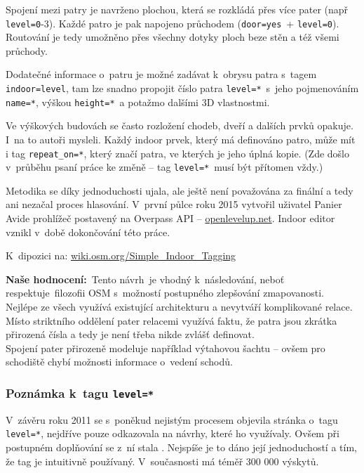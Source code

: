 Spojení mezi patry je navrženo plochou, která se rozkládá přes více pater (např \texttt{level=0}-3). Každé patro je pak napojeno průchodem (\texttt{door=yes}~+ \texttt{level=0}). Routování je tedy umožněno přes všechny dotyky ploch beze stěn a též všemi průchody.

Dodatečné informace o~patru je možné zadávat k~obrysu patra s~tagem \texttt{indoor=level}, tam lze snadno propojit číslo patra \texttt{level=*}~s~jeho pojmenováním \texttt{name=*}, výškou \texttt{height=*}~a potažmo dalšími 3D vlastnostmi.

Ve výškových budovách se často rozložení chodeb, dveří a dalších prvků opakuje. I~na to autoři mysleli. Každý indoor prvek, který má definováno patro, může mít i tag \texttt{repeat\_on=*}, který značí patra, ve kterých je jeho úplná kopie. (Zde došlo v~průběhu psaní práce ke změně -- tag \texttt{level=*}~musí být přítomen vždy.)

Metodika se díky jednoduchosti ujala, ale ještě není považována za finální a tedy ani nezačal proces hlasování. V~první půlce roku 2015 vytvořil uživatel Panier Avide prohlížeč postavený na Overpass API -- \href{http://openlevelup.net}{openlevelup.net}. Indoor editor vznikl v~době dokončování této práce.

K~dipozici na: \href{http://wiki.osm.org/Simple\_Indoor\_Tagging}{wiki.osm.org/Simple\_Indoor\_Tagging}

\textbf{Naše hodnocení:}~Tento návrh~je vhodný k~následování, neboť respektuje~filozofii OSM s~možností postupného zlepšování zmapovanosti. Nejlépe ze všech využívá existující architekturu a nevytváří komplikované relace. Místo striktního  oddělení pater relacemi využívá faktu, že patra jsou zkrátka přirozená čísla a tedy je není třeba nikde zvlášť definovat.\\
Spojení pater přirozeně modeluje například výtahovou šachtu -- ovšem pro schodiště chybí možnosti informace o~vedení schodů.

\subsubsection{Poznámka k~tagu \texttt{level=*}}\label{poznuxe1mka-k-tagu-level}

V~závěru roku 2011 se s~poněkud nejistým procesem objevila stránka o~tagu \texttt{level=*}, nejdříve pouze odkazovala na návrhy, které ho využívaly. Ovšem při postupném doplňování se z~ní stala . Nejspíše je to dáno její jednoduchostí a tím, že tag je intuitivně používaný. V~současnosti má téměř 300 000 výskytů.

